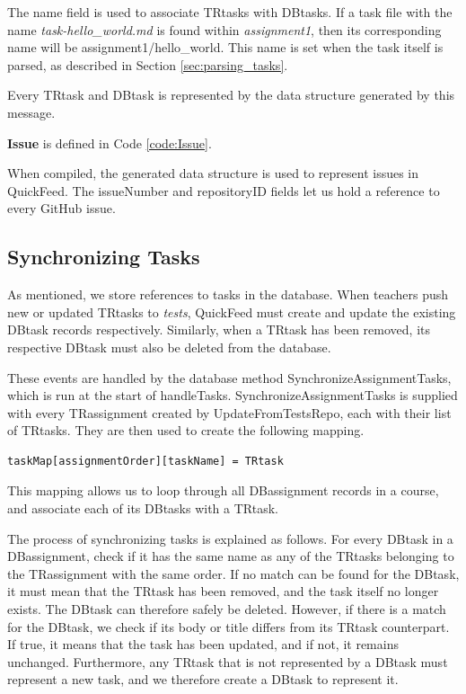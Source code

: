 The name field is used to associate TRtasks with DBtasks.
If a task file with the name \textit{task-hello\_world.md} is found within \textit{assignment1}, then its corresponding name will be assignment1/hello\_world.
This name is set when the task itself is parsed, as described in Section \ref{sec:parsing_tasks}.

Every TRtask and DBtask is represented by the data structure generated by this message.

\textbf{Issue} is defined in Code \ref{code:Issue}.



When compiled, the generated data structure is used to represent issues in QuickFeed.
The issueNumber and repositoryID fields let us hold a reference to every GitHub issue.

\subsection{Synchronizing Tasks}

As mentioned, we store references to tasks in the database.
When teachers push new or updated TRtasks to \textit{tests}, QuickFeed must create and update the existing DBtask records respectively.
Similarly, when a TRtask has been removed, its respective DBtask must also be deleted from the database.

These events are handled by the database method SynchronizeAssignmentTasks, which is run at the start of handleTasks.
SynchronizeAssignmentTasks is supplied with every TRassignment created by UpdateFromTestsRepo, each with their list of TRtasks.
They are then used to create the following mapping.
\begin{lstlisting}[caption={Task mapping}, language=Golang, label={code:task-mapping}, numbers=none, basicstyle=\ttfamily\footnotesize]
taskMap[assignmentOrder][taskName] = TRtask
\end{lstlisting}
This mapping allows us to loop through all DBassignment records in a course, and associate each of its DBtasks with a TRtask.

The process of synchronizing tasks is explained as follows.
For every DBtask in a DBassignment, check if it has the same name as any of the TRtasks belonging to the TRassignment with the same order.
If no match can be found for the DBtask, it must mean that the TRtask has been removed, and the task itself no longer exists.
The DBtask can therefore safely be deleted.
However, if there is a match for the DBtask, we check if its body or title differs from its TRtask counterpart.
If true, it means that the task has been updated, and if not, it remains unchanged.
Furthermore, any TRtask that is not represented by a DBtask must represent a new task, and we therefore create a DBtask to represent it.


